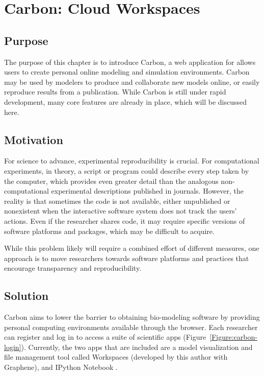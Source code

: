 \chapter{Carbon: Cloud Workspaces}
\label{chap:carbon}

\section{Purpose}
The purpose of this chapter is to introduce Carbon, a web application for allows users to create personal online modeling and simulation environments.
Carbon may be used by modelers to produce and collaborate new models online, or easily reproduce results from a publication.
While Carbon is still under rapid development, many core features are already in place, which will be discussed here.

\section{Motivation}

For science to advance, experimental reproducibility is crucial. \autocite{peng2011reproducible}
For computational experiments, in theory, a script or program could describe every step taken by the computer, which provides even greater detail than the analogous non-computational experimental descriptions published in journals.
However, the reality is that sometimes the code is not available, either unpublished or nonexistent when the interactive software system does not track the users’ actions.
Even if the researcher shares code, it may require specific versions of software platforms and packages, which may be difficult to acquire.

While this problem likely will require a combined effort of different measures, one approach is to move researchers towards software platforms and practices that encourage transparency and reproducibility.

\section{Solution}

Carbon aims to lower the barrier to obtaining bio-modeling software by providing personal computing environments available through the browser.
Each researcher can register and log in to access a suite of scientific apps (Figure~\ref{Figure:carbon-login}).
Currently, the two apps that are included are a model visualization and file management tool called Workspaces (developed by this author with Graphene), and IPython Notebook \autocite{perez2007ipython}.

